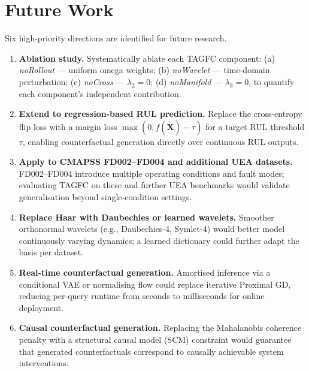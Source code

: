 \section{Future Work}

Six high-priority directions are identified for future research.

\begin{enumerate}
    \item \textbf{Ablation study.} Systematically ablate each TAGFC component: (a) \textit{noRollout} — uniform omega weights; (b) \textit{noWavelet} — time-domain perturbation; (c) \textit{noCross} — $\lambda_2=0$; (d) \textit{noManifold} — $\lambda_3=0$, to quantify each component's independent contribution.

    \item \textbf{Extend to regression-based RUL prediction.} Replace the cross-entropy flip loss with a margin loss $\max(0, f(\widetilde{\mathbf{X}}) - \tau)$ for a target RUL threshold $\tau$, enabling counterfactual generation directly over continuous RUL outputs.

    \item \textbf{Apply to CMAPSS FD002--FD004 and additional UEA datasets.} FD002--FD004 introduce multiple operating conditions and fault modes; evaluating TAGFC on these and further UEA benchmarks would validate generalisation beyond single-condition settings.

    \item \textbf{Replace Haar with Daubechies or learned wavelets.} Smoother orthonormal wavelets (e.g., Daubechies-4, Symlet-4) would better model continuously varying dynamics; a learned dictionary could further adapt the basis per dataset.

    \item \textbf{Real-time counterfactual generation.} Amortised inference via a conditional VAE or normalising flow could replace iterative Proximal GD, reducing per-query runtime from seconds to milliseconds for online deployment.

    \item \textbf{Causal counterfactual generation.} Replacing the Mahalanobis coherence penalty with a structural causal model (SCM) constraint would guarantee that generated counterfactuals correspond to causally achievable system interventions.
\end{enumerate}
